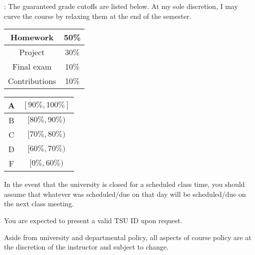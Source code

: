 \documentclass[letterpaper]{article}
\begin{document}
: The guaranteed grade cutoffs are listed below.  At my sole discretion, I may curve the course by relaxing them at the end of the semester.
\begin{center}
	\begin{tabular}{|c|c|} \hline
		Homework & 50\% \\ \hline
		Project & 30\% \\ \hline
		Final exam & 10\% \\ \hline
		Contributions & 10\% \\ \hline
	\end{tabular}
	\quad
	\begin{tabular}{|c|c|} \hline
		A & $[90\%,100\%]$\\ \hline
		B & $[80\%,90\%)$\\ \hline
		C & $[70\%,80\%)$\\ \hline
		D & $[60\%,70\%)$\\ \hline
		F & $[0\%,60\%)$\\ \hline
	\end{tabular}
\end{center}


%


\bu[Notes]
\bit
  \item In the event that the university is closed for a scheduled class time, you should assume that whatever was scheduled/due on that day will be scheduled/due on the next class meeting.
  \item You are expected to present a valid TSU ID upon request.
  \item Aside from university and departmental policy, all aspects of course policy are at the discretion of the instructor and subject to change.
\eit
\end{document}
